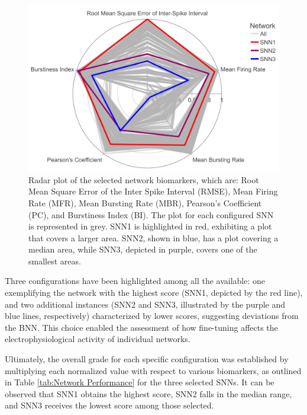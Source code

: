 \begin{figure}[ht!]
    \begin{center}
    \includegraphics[width=\linewidth]{Figure/Radar Plot Grades.jpg}
    \end{center}
    \caption{Radar plot of the selected network biomarkers, which are: Root Mean Square Error of the Inter Spike Interval (RMSE), Mean Firing Rate (MFR), Mean Bursting Rate (MBR), Pearson’s Coefficient (PC), and Burstiness Index (BI). The plot for each configured SNN is represented in grey. SNN1 is highlighted in red, exhibiting a plot that covers a larger area. SNN2, shown in blue, has a plot covering a median area, while SNN3, depicted in purple, covers one of the smallest areas.}
    \label{fig:Radar Plot Grades}
\end{figure}

Three configurations have been highlighted among all the available: one exemplifying the network with the highest score (SNN1, depicted by the red line), and two additional instances (SNN2 and SNN3, illustrated by the purple and blue lines, respectively) characterized by lower scores, suggesting deviations from the BNN. This choice enabled the assessment of how fine-tuning affects the electrophysiological activity of individual networks.

Ultimately, the overall grade for each specific configuration was established by multiplying each normalized value with respect to various biomarkers, as outlined in Table \ref{tab:Network Performance} for the three selected SNNs. It can be observed that SNN1 obtains the highest score, SNN2 falls in the median range, and SNN3 receives the lowest score among those selected.

